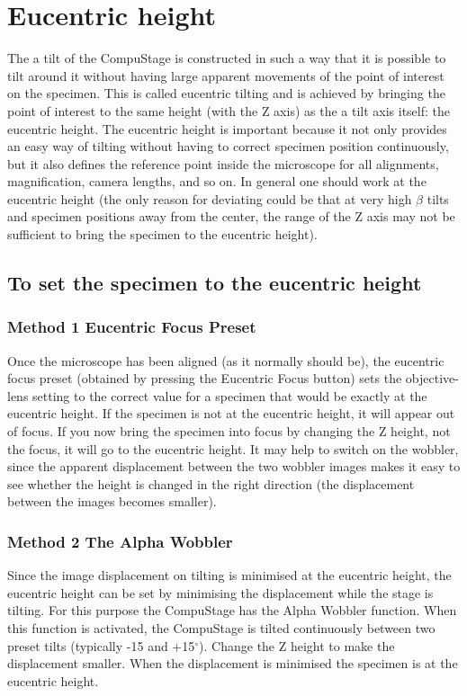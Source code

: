 \documentclass[12pt]{article}
\newcommand{\degree}{\ensuremath{^\circ}}
\begin{document}
\section{Eucentric height}
The a tilt of the CompuStage is constructed in such a way that it is
possible to tilt around it without having large apparent movements of
the point of interest on the specimen. This is called eucentric tilting
and is achieved by bringing the point of interest to the same height
(with the Z axis) as the a tilt axis itself: the eucentric height. The
eucentric height is important because it not only provides an easy way
of tilting without having to correct specimen position continuously,
but it also defines the reference point inside the microscope for all
alignments, magnification, camera lengths, and so on. In general one
should work at the eucentric height (the only reason for deviating
could be that at very high $\beta$ tilts and specimen positions away
from the center, the range of the Z axis may not be sufficient to
bring the specimen to the eucentric height).

\subsection{To set the specimen to the eucentric height}

\subsubsection{Method 1 Eucentric Focus Preset}

Once the microscope has been aligned (as it normally should be), the
eucentric focus preset (obtained by pressing the Eucentric Focus
button) sets the objective-lens setting to the correct value for a
specimen that would be exactly at the eucentric height. If the specimen
is not at the eucentric height, it will appear out of focus. If you now
bring the specimen into focus by changing the Z height, not the
focus, it will go to the eucentric height. It may help to switch on the
wobbler, since the apparent displacement between the two wobbler images
makes it easy to see whether the height is changed in the right
direction (the displacement between the images becomes smaller).

\subsubsection{Method 2 The Alpha Wobbler}

Since the image displacement on tilting is minimised at the eucentric
height, the eucentric height can be set by minimising the displacement
while the stage is tilting. For this purpose the CompuStage has the
Alpha Wobbler function. When this function is activated, the CompuStage
is tilted continuously between two preset tilts (typically -15 and
+15\degree ). Change the Z height to make the displacement smaller. When
the displacement is minimised the specimen is at the eucentric height.
\end{document}
